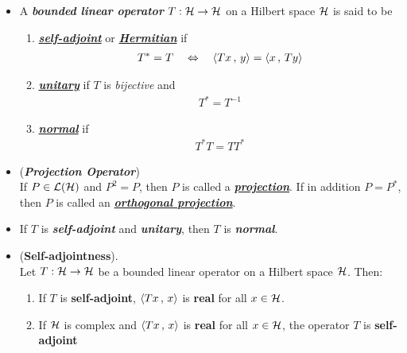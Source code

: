 \documentclass[11pt]{article}
\begin{document}
\begin{itemize}
\item \begin{definition}
A \textbf{\emph{bounded linear operator}} $T: {\mathcal H} \rightarrow {\mathcal H}$ on a Hilbert space ${\mathcal H}$ is said to be
\begin{enumerate}
\item \underline{\emph{\textbf{self-adjoint}}} or \underline{\emph{\textbf{Hermitian}}} if
\begin{align*}
T^{*} = T \quad \Leftrightarrow \quad \left\langle Tx\,,\, y \right\rangle = \left\langle x\,,\, Ty \right\rangle
\end{align*}
\item \underline{\emph{\textbf{unitary}}} if $T$ is \emph{bijective} and
\begin{align*}
T^{*} = T^{-1} 
\end{align*}
\item \underline{\emph{\textbf{normal}}} if
\begin{align*}
T^{*}T = TT^{*}
\end{align*}
\end{enumerate}
\end{definition}

\item \begin{definition} (\emph{\textbf{Projection Operator}})\\
If $P \in {\mathcal L}({\mathcal H})$ and $P^2 = P$, then $P$ is called a \underline{\emph{\textbf{projection}}}. If in addition $P = P^*$, then $P$ is called an \underline{\emph{\textbf{orthogonal projection}}}. 
\end{definition}

\item \begin{remark}
If $T$ is \emph{\textbf{self-adjoint}} and \emph{\textbf{unitary}}, then $T$ is \emph{\textbf{normal}}.
\end{remark}

\item \begin{proposition} (\textbf{Self-adjointness}).  \citep{kreyszig1989introductory} \\
 Let $T: {\mathcal H} \rightarrow {\mathcal H}$ be a bounded linear operator on a Hilbert space ${\mathcal H}$. Then:
 \begin{enumerate}
 \item If $T$ is \textbf{self-adjoint}, $\left\langle Tx\,,\, x \right\rangle$ is \textbf{real} for all $x \in {\mathcal H}$.
 \item If ${\mathcal H}$ is complex and $\left\langle Tx\,,\, x \right\rangle$ is \textbf{real} for all $x \in {\mathcal H}$, the operator $T$ is\textbf{ self-adjoint}
 \end{enumerate}
\end{proposition}


\end{itemize}
\end{document}
